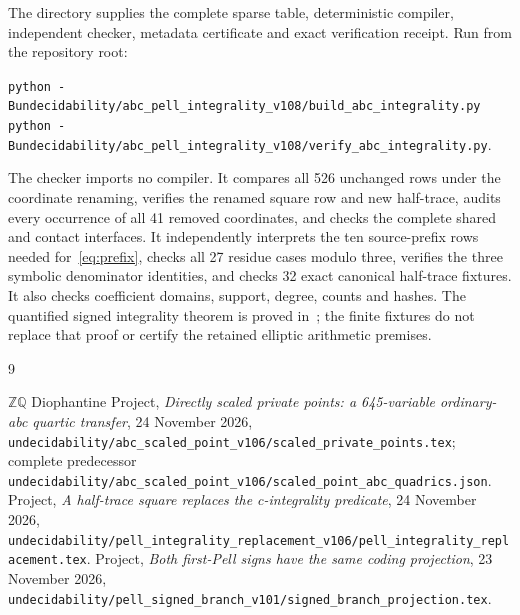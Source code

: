 \documentclass[10pt]{article}
\newcommand{\Q}{\mathbb Q}\newcommand{\Z}{\mathbb Z}
\begin{document}
The directory supplies the complete sparse table, deterministic compiler,
independent checker, metadata certificate and exact verification receipt.
Run from the repository root:
\begin{center}\small
\texttt{python -B}\enspace\nolinkurl{undecidability/abc_pell_integrality_v108/build_abc_integrality.py}\\
\texttt{python -B}\enspace\nolinkurl{undecidability/abc_pell_integrality_v108/verify_abc_integrality.py}.
\end{center}
The checker imports no compiler. It compares all 526 unchanged rows
under the coordinate renaming, verifies the renamed square row and new
half-trace, audits every occurrence of all 41 removed coordinates,
and checks the complete shared and contact interfaces. It independently
interprets the ten source-prefix rows needed for~\eqref{eq:prefix},
checks all 27 residue cases modulo three, verifies the three symbolic
denominator identities, and checks 32 exact canonical half-trace
fixtures. It also checks coefficient domains, support, degree, counts
and hashes. The quantified signed integrality theorem is proved
in~\cite{integrality}; the finite fixtures do not replace that proof
or certify the retained elliptic arithmetic premises.

\small
\begin{thebibliography}{9}\raggedright
\setlength{\itemsep}{2pt}
 \(\Z\Q\) Diophantine Project,
\emph{Directly scaled private points: a 645-variable ordinary-abc quartic
transfer}, 24 November 2026,
\nolinkurl{undecidability/abc_scaled_point_v106/scaled_private_points.tex};
complete predecessor
\nolinkurl{undecidability/abc_scaled_point_v106/scaled_point_abc_quadrics.json}.
 Project, \emph{A half-trace square replaces the
c-integrality predicate}, 24 November 2026,
\nolinkurl{undecidability/pell_integrality_replacement_v106/pell_integrality_replacement.tex}.
 Project, \emph{Both first-Pell signs have the same
coding projection}, 23 November 2026,
\nolinkurl{undecidability/pell_signed_branch_v101/signed_branch_projection.tex}.
\end{thebibliography}
\end{document}
